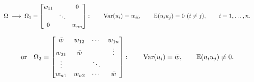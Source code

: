 \documentclass[11pt]{article}
\begin{document}
\[ \Omega \;\longrightarrow\; \Omega_{1} = \begin{bmatrix}
     w_{11} & & 0\\
     & \ddots & \\
     0 & & w_{nn}
   \end{bmatrix}:
   \qquad \operatorname{Var}(u_{i}) = w_{ii}, \qquad \mathbb{E}(u_{i}u_{j}) = 0 \ (i \neq j),
   \qquad i = 1, \dots, n . \]

\[ \text{or}\quad \Omega_{2} = \begin{bmatrix}
     \bar w & w_{12} & \cdots & w_{1n}\\
     w_{21} & \bar w & & \vdots\\
     \vdots & & \ddots & \\
     w_{n1} & w_{n2} & \cdots & \bar w
   \end{bmatrix}:
   \qquad \operatorname{Var}(u_{i}) = \bar w, \qquad \mathbb{E}(u_{i}u_{j}) \neq 0 . \]
\end{document}
